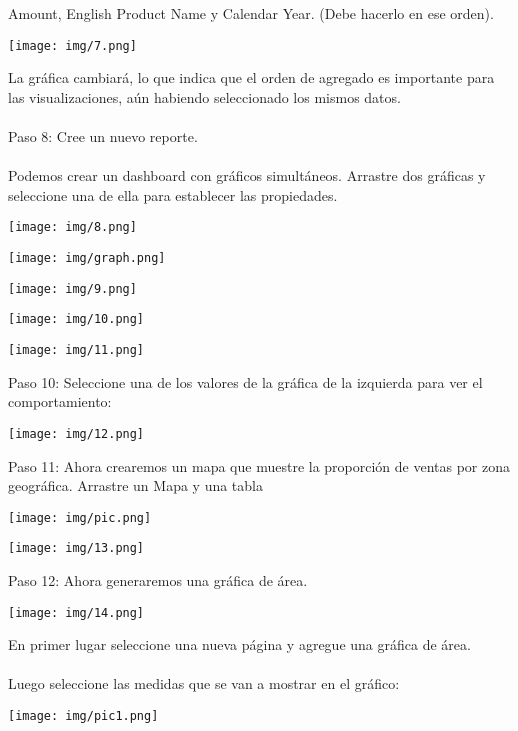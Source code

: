 \documentclass[12pt,letterpaper]{article}
\begin{document}
Amount, English Product Name y Calendar Year. (Debe hacerlo en ese orden).
\begin{center}
    \texttt{[image: img/7.png]}  
\end{center}
La gráfica cambiará, lo que indica que el orden de agregado es importante para las visualizaciones, aún
habiendo seleccionado los mismos datos.
\\\\Paso 8: Cree un nuevo reporte.
\\\\Podemos crear un dashboard con gráficos simultáneos. Arrastre dos gráficas y seleccione una de ella
para establecer las propiedades.
\begin{center}
    \texttt{[image: img/8.png]}  
\end{center}
\begin{center}
    \texttt{[image: img/graph.png]}  
\end{center}
\begin{center}
    \texttt{[image: img/9.png]}  
\end{center}
\begin{center}
    \texttt{[image: img/10.png]}  
\end{center}
\begin{center}
    \texttt{[image: img/11.png]}  
\end{center}
Paso 10: Seleccione una de los valores de la gráfica de la izquierda para ver el comportamiento:
\begin{center}
    \texttt{[image: img/12.png]}  
\end{center}
Paso 11: Ahora crearemos un mapa que muestre la proporción de ventas por zona geográfica. Arrastre
un Mapa y una tabla
\begin{center}
    \texttt{[image: img/pic.png]}  
\end{center}
\begin{center}
    \texttt{[image: img/13.png]}  
\end{center}
Paso 12: Ahora generaremos una gráfica de área.
\begin{center}
    \texttt{[image: img/14.png]}  
\end{center}
En primer lugar seleccione una nueva página y agregue una gráfica de área.
\\\\Luego seleccione las medidas que se van a mostrar en el gráfico:
\begin{center}
    \texttt{[image: img/pic1.png]}  
\end{center}
\end{document}
